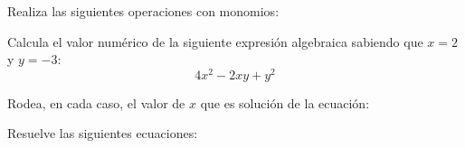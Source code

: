 \documentclass[spanish, 11pt]{exam}
\begin{document}
\begin{questions}
\question[1]
Realiza las siguientes operaciones con monomios:
\begin{multicols}{2}
\end{multicols}

\question[1]
Calcula el valor numérico de la siguiente expresión algebraica sabiendo que \( x = 2 \) y \( y = -3 \):
\[
4x^2 - 2xy + y^2
\]


\question
Rodea, en cada caso, el valor de \( x \) que es solución de la ecuación:

\question
Resuelve las siguientes ecuaciones:
\end{questions}
\end{document}
